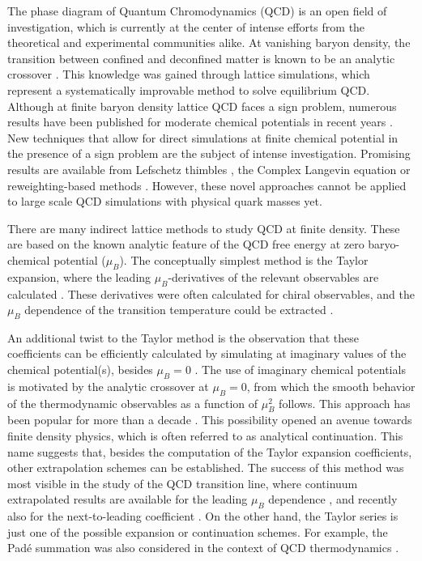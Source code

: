 \documentclass[aps,prd,twocolumn,superscriptaddress]{revtex4-2}
\begin{document}
The phase diagram of Quantum Chromodynamics 
(QCD) is an open field of investigation, which is 
currently at the center of intense efforts from the 
theoretical and experimental communities alike. 
At vanishing baryon density, the transition between
confined and deconfined matter is known to be an
analytic crossover \cite{Aoki:2006we}. This knowledge was
gained through lattice simulations, which represent a systematically
improvable method to solve equilibrium QCD. 
Although at finite baryon density lattice QCD faces a sign
problem, numerous results have been published
for moderate chemical potentials in recent years
\cite{Guenther:2020vqg,Ratti:2018ksb}.  New techniques that allow for direct
simulations at finite chemical potential in the presence of a
sign problem are the subject of intense investigation. Promising
results are available from Lefschetz thimbles \cite{Cristoforetti:2012su,Alexandru:2015xva,Fukuma:2019uot},
the Complex Langevin equation \cite{Aarts:2012ft,Sexty:2013ica,Scherzer:2019lrh}
or reweighting-based methods \cite{Giordano:2020roi}.
However, these novel approaches cannot be applied to large
scale QCD simulations with physical quark masses yet.

There are many indirect lattice methods to study QCD
at finite density. These are based on the known analytic
feature of the QCD free energy at zero baryo-chemical potential ($\mu_B$).
The conceptually simplest method is the Taylor expansion, where
the leading $\mu_B$-derivatives of the relevant observables
are calculated
\cite{Allton:2002zi,Allton:2005gk,Borsanyi:2012cr,Bazavov:2017dus}.
These derivatives were often calculated for chiral observables,
and the $\mu_B$ dependence of the transition temperature could
be extracted
\cite{Kaczmarek:2011zz,Endrodi:2011gv,Bonati:2018nut,Bazavov:2018mes}.

An additional twist to the Taylor method is the observation that these
coefficients can be efficiently calculated by simulating at
imaginary values of the chemical potential(s), besides $\mu_B=0$
\cite{DElia:2016jqh,Borsanyi:2018grb}. The use of imaginary chemical
potentials is motivated by the analytic crossover at $\mu_B=0$, from
which the smooth behavior of the thermodynamic observables 
as a function of $\mu_B^2$ follows. This approach has been popular
for more than a decade \cite{deForcrand:2002hgr,DElia:2002tig,DElia:2007bkz,Cea:2009ba,Cea:2010bz,Bonati:2013tqa,Bonati:2018nut}.
This possibility opened an avenue towards finite density physics, which is
often referred to as analytical continuation.
This name suggests that, besides the computation of the Taylor expansion
coefficients, other extrapolation schemes can be established.  The success of
this method was most visible in the study of the QCD transition line, where 
continuum extrapolated results are available for the leading $\mu_B$ dependence
\cite{Bonati:2015bha,Cea:2015cya,Bellwied:2015rza,Bonati:2018nut}, and recently
also for the
next-to-leading coefficient \cite{Borsanyi:2020fev}.
On the other hand, the Taylor series is just one of the possible
expansion or continuation schemes.
For example, the Pad\'e summation was also considered in
the context of QCD thermodynamics
\cite{Karsch:2010hm,Cea:2012ev,Datta:2016ukp,Pasztor:2020dur,Schmidt:2021pey}
.
\end{document}
